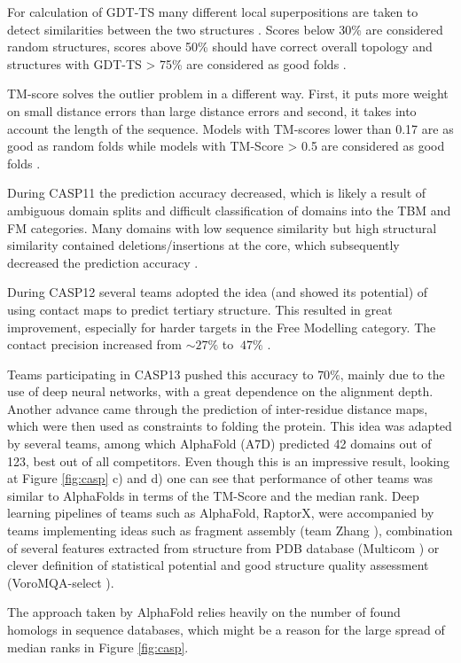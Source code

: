 For calculation of GDT-TS many different local superpositions are taken to detect similarities between the two structures \cite{gdt1}. Scores below 30\% are considered random structures, scores above 50\% should have correct overall topology and structures with GDT-TS > 75\% are considered as good folds \cite{casp13}.

TM-score solves the outlier problem in a different way. First, it puts more weight on small distance errors than large distance errors and second, it takes into account the length of the sequence. Models with TM-scores lower than 0.17 are as good as random folds while models with TM-Score > 0.5 are considered as good folds \cite{tmscore}.

During CASP11 the prediction accuracy decreased, which is likely a result of ambiguous domain splits and difficult classification of domains into the TBM and FM categories. Many domains with low sequence similarity but high structural similarity contained deletions/insertions at the core, which subsequently decreased the prediction accuracy \cite{casp11}.

During CASP12 several teams adopted the idea (and showed its potential) of using contact maps to predict tertiary structure. This resulted in great improvement, especially for harder targets in the Free Modelling category. The contact precision increased from $\sim 27\%$ to $~47\%$ \cite{casp12}.

Teams participating in CASP13 pushed this accuracy to $70\%$, mainly due to the use of deep neural networks, with a great dependence on the alignment depth. Another advance came through the prediction of inter-residue distance maps, which were then used as constraints to folding the protein. This idea was adapted by several teams, among which AlphaFold (A7D) predicted 42 domains out of 123, best out of all competitors. Even though this is an impressive result, looking at Figure \ref{fig:casp} c) and d) one can see that performance of other teams was similar to AlphaFolds in terms of the TM-Score and the median rank. Deep learning pipelines of teams such as AlphaFold, RaptorX, were accompanied by teams implementing ideas such as fragment assembly (team Zhang \cite{zhang}), combination of several features extracted from structure from PDB database (Multicom \cite{multicom}) or clever definition of statistical potential and good structure quality assessment (VoroMQA-select \cite{voromqa}).

The approach taken by AlphaFold relies heavily on the number of found homologs in sequence databases, which might be a reason for the large spread of median ranks in Figure \ref{fig:casp}.

